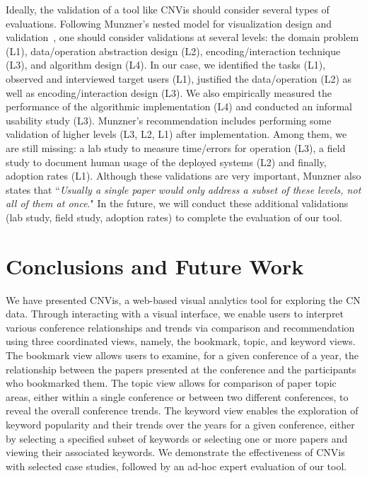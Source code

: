\documentclass[letterpaper,twocolumn,fleqn]{article}
\begin{document}
Ideally, the validation of a tool like CNVis should consider several types of evaluations. Following Munzner's nested model for visualization design and validation~\cite{Munzner-TVCG09}, one should consider validations at several levels: the domain problem (L1), data/operation abstraction design (L2), encoding/interaction technique (L3), and algorithm design (L4). In our case, we identified the tasks (L1), observed and interviewed target users (L1),  justified the data/operation (L2) as well as encoding/interaction design (L3). We also  empirically measured the performance of the algorithmic implementation (L4) and conducted an informal usability study (L3). Munzner's recommendation includes performing some validation of higher levels (L3, L2, L1) after implementation. Among them, we are still missing: a lab study to measure time/errors for operation (L3), a field study to document human usage of the deployed systems (L2) and finally, adoption rates (L1). Although these validations are very important, Munzner also states that ``{\em Usually a single paper would only address a subset of these levels, not all of them at once}." In the future, we will conduct these additional validations (lab study, field study, adoption rates) to complete the evaluation of our tool.

\section{Conclusions and Future Work}
\label{sec:conc}

We have presented CNVis, a web-based visual analytics tool for exploring the CN data. %
Through interacting with a visual interface, we enable users to interpret various conference relationships and trends via comparison and recommendation using three coordinated views, namely, the bookmark, topic, and keyword views. The bookmark view allows users to examine, for a given conference of a year, the relationship between the papers presented at the conference and the participants who bookmarked them. The topic view allows for comparison of paper topic areas, either within a single conference or between two different conferences, to reveal the overall conference trends. The keyword view enables the exploration of keyword popularity and their trends over the years for a given conference, either by selecting a specified subset of keywords or selecting one or more papers and viewing their associated keywords. We demonstrate the effectiveness of CNVis with selected case studies, followed by an ad-hoc expert evaluation of our tool.
\end{document}
